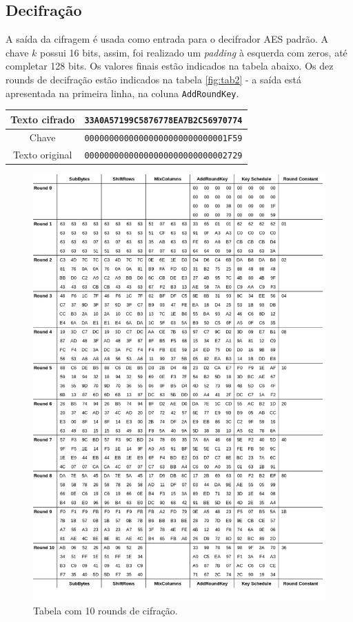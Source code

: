 \documentclass{article}
\begin{document}
\subsection{Decifração}
A saída da cifragem é usada como entrada para o decifrador AES padrão. A chave
$k$ possui 16 bits, assim, foi realizado um \textit{padding} à esquerda com
zeros, até completar 128 bits. Os valores finais estão indicados na tabela
abaixo. Os dez rounds de decifração estão indicados na tabela \ref{fig:tab2} -
a saída está apresentada na primeira linha, na coluna \texttt{AddRoundKey}.
\begin{center}
    \begin{tabular}{|c|c|}
        \hline
        Texto cifrado & \texttt{33A0A57199C5876778EA7B2C56970774} \\
        \hline
        Chave & \texttt{00000000000000000000000000001F59} \\
        \hline
        Texto original & \texttt{00000000000000000000000000002729} \\
        \hline
    \end{tabular}
\end{center}




\appendix
\begin{figure}
    \centering
    \includegraphics[width=1\linewidth]{imgs/table_aes_ciph.jpg}
    \caption{Tabela com 10 rounds de cifração.}
    \label{fig:tab1}
\end{figure}
\end{document}
